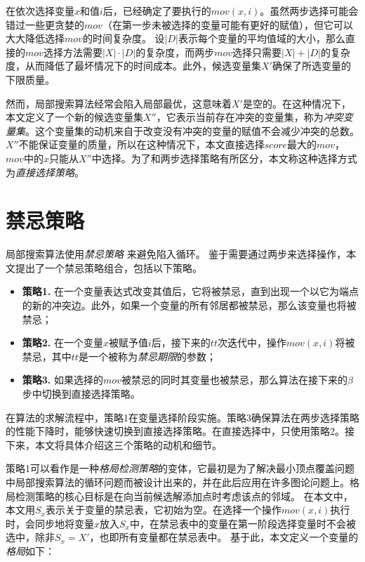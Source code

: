在依次选择变量$x$和值$i$后，已经确定了要执行的$mov(x, i)$。虽然两步选择可能会错过一些更贪婪的$mov$（在第一步未被选择的变量可能有更好的赋值），但它可以大大降低选择$mov$的时间复杂度。
设$|D|$表示每个变量的平均值域的大小，那么直接的$mov$选择方法需要$|X| \cdot |D|$的复杂度，而两步$mov$选择只需要$|X| + |D|$的复杂度，从而降低了最坏情况下的时间成本。此外，候选变量集$X'$确保了所选变量的下限质量。

然而，局部搜索算法经常会陷入局部最优，这意味着$X'$是空的。在这种情况下，本文定义了一个新的候选变量集$X''$，它表示当前存在冲突的变量集，称为\textit{冲突变量集}。这个变量集的动机来自于改变没有冲突的变量的赋值不会减少冲突的总数。$X''$不能保证变量的质量，所以在这种情况下，本文直接选择$score$最大的$mov$，$mov$中的$x$只能从$X''$中选择。为了和两步选择策略有所区分，本文称这种选择方式为\textit{直接选择策略}。

\section{禁忌策略}
局部搜索算法使用{\it 禁忌策略} \cite{glover1998tabu}来避免陷入循环。
鉴于需要通过两步来选择操作，本文提出了一个禁忌策略组合，包括以下策略。

\begin{itemize}
    \item \textbf{策略1.} 在一个变量表达式改变其值后，它将被禁忌，直到出现一个以它为端点的新的冲突边。此外，如果一个变量的所有邻居都被禁忌，那么该变量也将被禁忌；
    \item \textbf{策略2.} 在一个变量$x$被赋予值$i$后，接下来的$tt$次迭代中，操作$mov(x,i)$将被禁忌，其中$tt$是一个被称为{\it 禁忌期限}的参数；
    \item \textbf{策略3.} 如果选择的$mov$被禁忌的同时其变量也被禁忌，那么算法在接下来的$\beta$步中切换到直接选择策略。
\end{itemize}

在算法的求解流程中，策略1在变量选择阶段实施。策略3确保算法在两步选择策略的性能下降时，能够快速切换到直接选择策略。在直接选择中，只使用策略2。接下来，本文将具体介绍这三个策略的动机和细节。

策略1可以看作是一种\textit{格局检测策略}\cite{cai2011local}的变体，它最初是为了解决最小顶点覆盖问题中局部搜索算法的循环问题而被设计出来的，并在此后应用在许多图论问题上。格局检测策略的核心目标是在向当前候选解添加点时考虑该点的邻域。
在本文中，本文用$S_x$表示关于变量的禁忌表，它初始为空。在选择一个操作$mov(x,i)$执行时，会同步地将变量$x$放入$S_x$中，在禁忌表中的变量在第一阶段选择变量时不会被选中，除非$S_x = X'$，也即所有变量都在禁忌表中。
基于此，本文定义一个变量的\textit{格局}如下：


